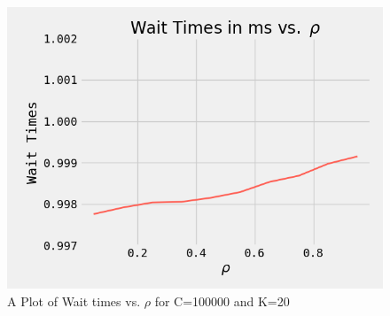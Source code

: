 \begin{figure}
 \centering
 \captionsetup{justification=centering}
 \begin{center}
  \includegraphics[width=0.8\linewidth]{Figures/task4.png}
 \end{center}
 \caption{A Plot of Wait times vs. $\rho$ for C=100000 and K=20}
 \label{fig7}
\end{figure}